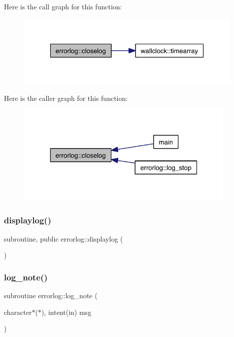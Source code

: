 Here is the call graph for this function\+:\nopagebreak
\begin{figure}[H]
\begin{center}
\leavevmode
\includegraphics[width=314pt]{namespaceerrorlog_af9219c790b58905faca7f5695515325d_cgraph}
\end{center}
\end{figure}
Here is the caller graph for this function\+:\nopagebreak
\begin{figure}[H]
\begin{center}
\leavevmode
\includegraphics[width=304pt]{namespaceerrorlog_af9219c790b58905faca7f5695515325d_icgraph}
\end{center}
\end{figure}
\mbox{\label{namespaceerrorlog_a05d233f410ba88bf3e2929528b1bb91e}} 
\subsubsection{\texorpdfstring{displaylog()}{displaylog()}}
{\footnotesize\ttfamily subroutine, public errorlog\+::displaylog (\begin{DoxyParamCaption}{ }\end{DoxyParamCaption})}

\mbox{\label{namespaceerrorlog_abcaf87ab55e0634007cc7177aa53469c}} 
\subsubsection{\texorpdfstring{log\+\_\+note()}{log\_note()}}
{\footnotesize\ttfamily subroutine errorlog\+::log\+\_\+note (\begin{DoxyParamCaption}\item[{character$\ast$($\ast$), intent(in)}]{msg }\end{DoxyParamCaption})\hspace{0.3cm}{\ttfamily [private]}}

